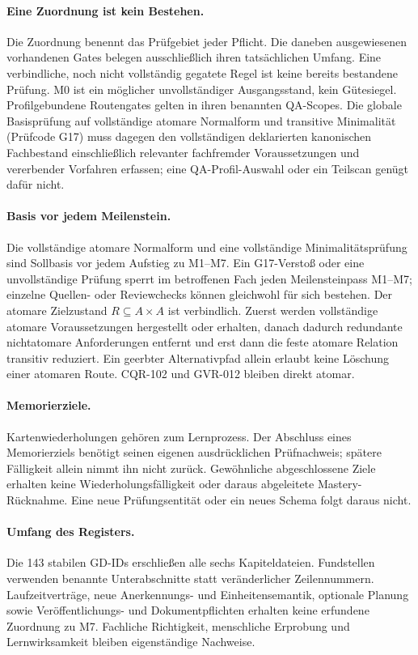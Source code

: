 \paragraph{Eine Zuordnung ist kein Bestehen.}
Die Zuordnung benennt das Prüfgebiet jeder Pflicht. Die daneben ausgewiesenen vorhandenen Gates belegen ausschließlich ihren tatsächlichen Umfang. Eine verbindliche, noch nicht vollständig gegatete Regel ist keine bereits bestandene Prüfung. M0 ist ein möglicher unvollständiger Ausgangsstand, kein Gütesiegel. Profilgebundene Routengates gelten in ihren benannten QA-Scopes. Die globale Basisprüfung auf vollständige atomare Normalform und transitive Minimalität (Prüfcode G17) muss dagegen den vollständigen deklarierten kanonischen Fachbestand einschließlich relevanter fachfremder Voraussetzungen und vererbender Vorfahren erfassen; eine QA-Profil-Auswahl oder ein Teilscan genügt dafür nicht.

\paragraph{Basis vor jedem Meilenstein.}
Die vollständige atomare Normalform und eine vollständige Minimalitätsprüfung sind Sollbasis vor jedem Aufstieg zu M1–M7. Ein G17-Verstoß oder eine unvollständige Prüfung sperrt im betroffenen Fach jeden Meilensteinpass M1–M7; einzelne Quellen- oder Reviewchecks können gleichwohl für sich bestehen. Der atomare Zielzustand \(R\subseteq A\times A\) ist verbindlich. Zuerst werden vollständige atomare Voraussetzungen hergestellt oder erhalten, danach dadurch redundante nichtatomare Anforderungen entfernt und erst dann die feste atomare Relation transitiv reduziert. Ein geerbter Alternativpfad allein erlaubt keine Löschung einer atomaren Route. CQR-102 und GVR-012 bleiben direkt atomar.

\paragraph{Memorierziele.}
Kartenwiederholungen gehören zum Lernprozess. Der Abschluss eines Memorierziels benötigt seinen eigenen ausdrücklichen Prüfnachweis; spätere Fälligkeit allein nimmt ihn nicht zurück. Gewöhnliche abgeschlossene Ziele erhalten keine Wiederholungsfälligkeit oder daraus abgeleitete Mastery-Rücknahme. Eine neue Prüfungsentität oder ein neues Schema folgt daraus nicht.

\paragraph{Umfang des Registers.}
Die 143 stabilen GD-IDs erschließen alle sechs Kapiteldateien. Fundstellen verwenden benannte Unterabschnitte statt veränderlicher Zeilennummern. Laufzeitverträge, neue Anerkennungs- und Einheitensemantik, optionale Planung sowie Veröffentlichungs- und Dokumentpflichten erhalten keine erfundene Zuordnung zu M7. Fachliche Richtigkeit, menschliche Erprobung und Lernwirksamkeit bleiben eigenständige Nachweise.

